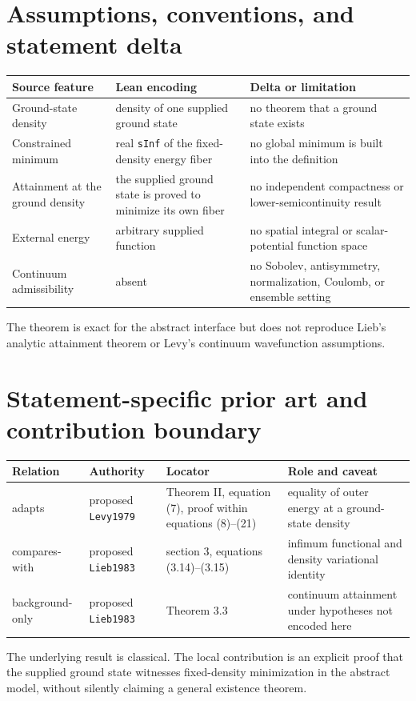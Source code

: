 \section{Assumptions, conventions, and statement delta}
\begin{tabularx}{\textwidth}{@{}YYY@{}}
\toprule
Source feature & Lean encoding & Delta or limitation \\
\midrule
Ground-state density & density of one supplied ground state & no theorem that a ground state exists \\
Constrained minimum & real \texttt{sInf} of the fixed-density energy fiber & no global minimum is built into the definition \\
Attainment at the ground density & the supplied ground state is proved to minimize its own fiber & no independent compactness or lower-semicontinuity result \\
External energy & arbitrary supplied function & no spatial integral or scalar-potential function space \\
Continuum admissibility & absent & no Sobolev, antisymmetry, normalization, Coulomb, or ensemble setting \\
\bottomrule
\end{tabularx}
The theorem is exact for the abstract interface but does not reproduce Lieb's analytic attainment
theorem or Levy's continuum wavefunction assumptions.

\section{Statement-specific prior art and contribution boundary}
\begin{tabularx}{\textwidth}{@{}lYYY@{}}
\toprule
Relation & Authority & Locator & Role and caveat \\
\midrule
adapts & proposed \texttt{Levy1979} & Theorem II, equation (7), proof within equations (8)--(21) & equality of outer energy at a ground-state density \\
compares-with & proposed \texttt{Lieb1983} & section 3, equations (3.14)--(3.15) & infimum functional and density variational identity \\
background-only & proposed \texttt{Lieb1983} & Theorem 3.3 & continuum attainment under hypotheses not encoded here \\
\bottomrule
\end{tabularx}
The underlying result is classical.  The local contribution is an explicit proof that the supplied
ground state witnesses fixed-density minimization in the abstract model, without silently claiming
a general existence theorem.


